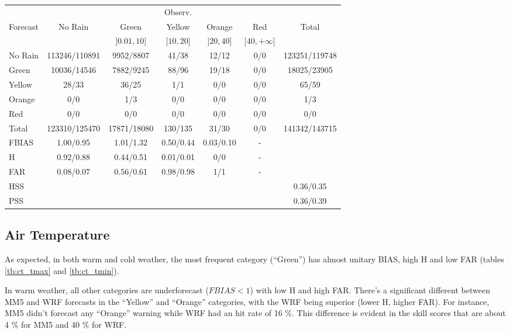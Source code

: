 \begin{table}[!htp]
\small
\centering
{}
\begin{tabular}{l|cccccc}
\toprule
         &         &             & Observ.   &           &                 & \\ 
Forecast & No Rain & Green       & Yellow    & Orange    & Red             & Total \\
         &         & $]0.01,10]$ & $]10,20]$ & $]20,40]$ & $]40,+\infty]$ &  \\
\midrule
No Rain & 113246/110891 & 9952/8807 & 41/38 & 12/12 & 0/0 & 123251/119748 \\
Green   & 10036/14546 & 7882/9245 & 88/96 & 19/18 & 0/0 & 18025/23905 \\
Yellow  & 28/33 & 36/25 & 1/1 & 0/0 & 0/0 & 65/59 \\
Orange  & 0/0 & 1/3 & 0/0 & 0/0 & 0/0 & 1/3 \\
Red     & 0/0 & 0/0 & 0/0 & 0/0 & 0/0 & 0/0 \\
Total   & 123310/125470 & 17871/18080 & 130/135 & 31/30 & 0/0 & 141342/143715 \\
\bottomrule
FBIAS   & 1.00/0.95 & 1.01/1.32 & 0.50/0.44 & 0.03/0.10 & - & \\ 
H       & 0.92/0.88 & 0.44/0.51 & 0.01/0.01 & 0/0 & - & \\ 
FAR     & 0.08/0.07 & 0.56/0.61 & 0.98/0.98 & 1/1 & - & \\ 
\midrule
HSS & & & & & & 0.36/0.35 \\
PSS & & & & & & 0.36/0.39 \\
\bottomrule
\end{tabular}
\label{tb:ct_pcp1h}
\end{table}
\FloatBarrier

\subsection{Air Temperature}

As expected, in both warm and cold weather, the most frequent category (“Green”) has almost unitary BIAS, high H and low FAR (tables \ref{tb:ct_tmax} and \ref{tb:ct_tmin}). 

In warm weather, all other categories are underforecast ($FBIAS < 1$) with low H and high FAR. There's a significant different between MM5 and WRF forecasts in the “Yellow” and “Orange” categories, with the WRF being superior (lower H, higher FAR). For instance, MM5 didn't forecast any “Orange” warning while WRF had an hit rate of 16 \%. This difference is evident in the skill scores that are about 4 \% for MM5 and 40 \% for WRF.

